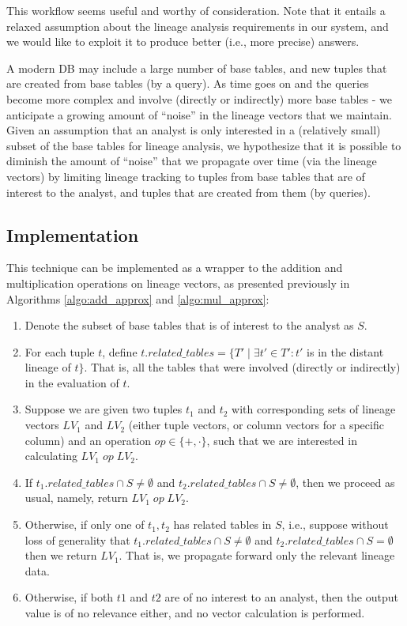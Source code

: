 This workflow seems useful and worthy of consideration. Note that it entails a relaxed assumption about the lineage analysis requirements in our system, and we would like to exploit it to produce better (i.e., more precise) answers.
\par A modern DB may include a large number of base tables, and new tuples that are created from base tables (by a query). As time goes on and the queries become more complex and involve (directly or indirectly) more base tables - we anticipate a growing amount of ``noise'' in the lineage vectors that we maintain.
Given an assumption that an analyst is only interested in a (relatively small) subset of the base tables for lineage analysis, we hypothesize that it is possible to diminish the amount of ``noise'' that we propagate over time (via the lineage vectors) by limiting lineage tracking to tuples from base tables that are of interest to the analyst, and tuples that are created from them (by queries).

\subsection{Implementation}
This technique can be implemented as a wrapper to the addition and multiplication operations on lineage vectors, as presented previously in Algorithms \ref{algo:add_approx} and \ref{algo:mul_approx}: 
\begin{enumerate}
    \item Denote the subset of base tables that is of interest to the analyst as $S$.
    \item For each tuple $t$, define $t.related\_tables = \{T'\; |\; \exists t' \in T': t'$ is in the distant lineage of $t\}$. That is, all the tables that were involved (directly or indirectly) in the evaluation of $t$.
    \item Suppose we are given two tuples $t_1$ and $t_2$ with corresponding sets of lineage vectors $LV_1$ and $LV_2$ (either tuple vectors, or column vectors for a specific column) and an operation $op \in \{+, \cdot\}$, such that we are interested in calculating $LV_1 \; op \; LV_2$.
    \item If $t_1.related\_tables \cap S \neq \emptyset$ and $t_2.related\_tables \cap S \neq \emptyset$, then we proceed as usual, namely, return $LV_1 \; op \; LV_2$. 
    \item Otherwise, if only one of $t_1, t_2$ has related tables in $S$, i.e., suppose without loss of generality that $t_1.related\_tables \cap S \neq \emptyset$ and $t_2.related\_tables \cap S = \emptyset$ then we return $LV_1$.
    That is, we propagate forward only the relevant lineage data.
    \item Otherwise, if both $t1$ and $t2$ are of no interest to an analyst, then the output value is of no relevance either, and no vector calculation is performed.
\end{enumerate}

